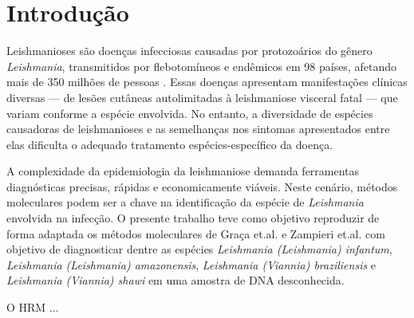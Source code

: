 \section{Introdução}

Leishmanioses são doenças infecciosas causadas por protozoários do gênero
\textit{Leishmania}, transmitidos por flebotomíneos e endêmicos em 98 países,
afetando mais de 350 milhões de pessoas \cite{hong2020one}. Essas doenças
apresentam manifestações clínicas diversas — de lesões cutâneas autolimitadas à
leishmaniose visceral fatal — que variam conforme a espécie envolvida. No
entanto, a diversidade de espécies causadoras de leishmanioses e as semelhanças
nos sintomas apresentados entre elas dificulta o adequado tratamento
espécies-específico da doença.

A complexidade da epidemiologia da leishmaniose demanda ferramentas diagnósticas
precisas, rápidas e economicamente viáveis.  Neste cenário, métodos moleculares
podem ser a chave na identificação da espécie de \textit{Leishmania} envolvida
na infecção. O presente trabalho teve como objetivo reproduzir de forma adaptada
os métodos moleculares de Graça
et.al.\cite{RFLPgraca2012} e Zampieri et.al.\cite{HRMzampi2016} com objetivo de
diagnosticar dentre as espécies \textit{Leishmania (Leishmania) infantum},
\textit{Leishmania (Leishmania) amazonensis}, \textit{Leishmania (Viannia)
braziliensis} e \textit{Leishmania (Viannia)
shawi} em uma amostra de DNA desconhecida. 

O HRM ...

